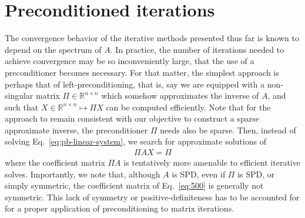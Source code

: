 \documentclass[numbers,webpdf,imanum]{ima-authoring-template}%
\theoremstyle{thmstyletwo}%
\numberwithin{equation}{section}
\begin{document}
\section{Preconditioned iterations}\label{sec:precond-iter}
The convergence behavior of the iterative methods presented thus far is known to depend on the spectrum of $A$.
In practice, the number of iterations needed to achieve convergence may be so inconveniently large, that the use of a preconditioner becomes necessary.
For that matter, the simplest approach is perhaps that of left-preconditioning, that is, say we are equipped with a non-singular matrix $\Pi\in\mathbb{R}^{n\times n}$ which somehow approximates the inverse of $A$, and such that $X\in\mathbb{R}^{n\times n}\mapsto \Pi X$ can be computed efficiently.
Note that for the approach to remain consistent with our objective to construct a sparse approximate inverse, the preconditioner $\Pi$ needs also be sparse.
Then, instead of solving Eq.~\eqref{eq:pb-linear-system}, we search for approximate solutions of
\begin{align}\label{eq:500}
\Pi AX=\Pi
\end{align}
where the coefficient matrix $\Pi A$ is tentatively more amenable to efficient iterative solves.
Importantly, we note that, although $A$ is SPD, even if $\Pi$ is SPD, or simply symmetric, the coefficient matrix of Eq.~\eqref{eq:500} is generally not symmetric.
This lack of symmetry or positive-definiteness has to be accounted for for a proper application of preconditioning to matrix iterations.

\end{document}
